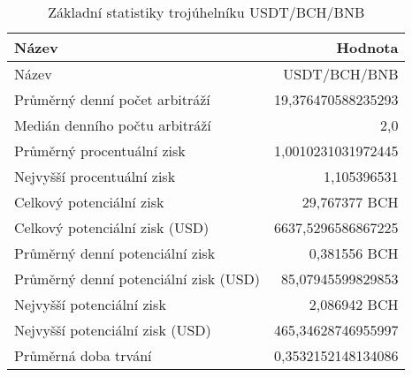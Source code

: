\begin{table}\centering
\caption{Základní statistiky trojúhelníku USDT/BCH/BNB}
\label{USDTBCHBNB_stats}
\begin{tabular}{|| l | r ||}
\hline Název & Hodnota \\ 
\hline\hline Název & USDT/BCH/BNB \\ 
\hline Průměrný denní počet arbitráží & 19,376470588235293 \\ 
\hline Medián denního počtu arbitráží & 2,0 \\ 
\hline Průměrný procentuální zisk & 1,0010231031972445 \\ 
\hline Nejvyšší procentuální zisk & 1,105396531 \\ 
\hline Celkový potenciální zisk & 29,767377 BCH \\ 
\hline Celkový potenciální zisk (USD) & 6637,5296586867225 \\ 
\hline Průměrný denní potenciální zisk & 0,381556 BCH \\ 
\hline Průměrný denní potenciální zisk (USD) & 85,07945599829853 \\ 
\hline Nejvyšší potenciální zisk & 2,086942 BCH \\ 
\hline Nejvyšší potenciální zisk (USD) & 465,34628746955997 \\ 
\hline Průměrná doba trvání & 0,3532152148134086 \\ 
\hline
\end{tabular}
\end{table}